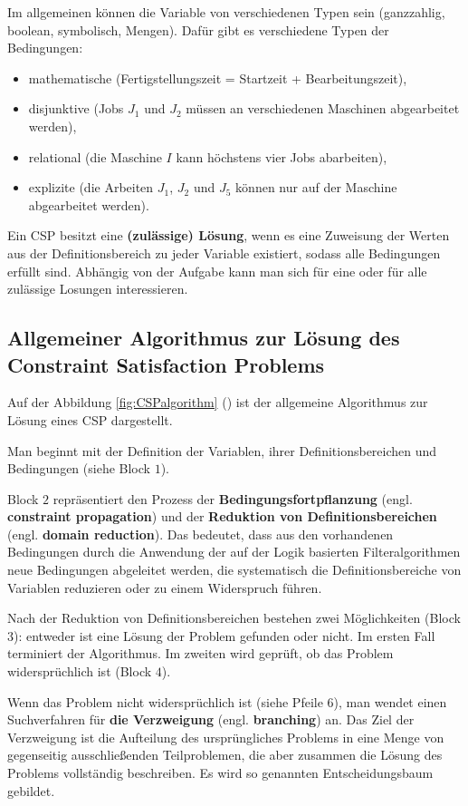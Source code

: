 Im allgemeinen können die Variable von verschiedenen Typen sein (ganzzahlig, boolean, symbolisch, Mengen). Dafür gibt es verschiedene Typen der Bedingungen:
\begin{itemize}
	\setlength{\itemsep}{0pt}
	\item mathematische (Fertigstellungszeit = Startzeit + Bearbeitungszeit),
	\item disjunktive (Jobs $J_1$ und $J_2$ müssen an verschiedenen Maschinen abgearbeitet werden),
	\item relational (die Maschine $I$ kann höchstens vier Jobs abarbeiten),
	\item explizite (die Arbeiten $J_1$, $J_2$ und $J_5$ können nur auf der Maschine abgearbeitet werden).
\end{itemize}
Ein CSP besitzt eine {\bf (zulässige) Lösung}, wenn es eine Zuweisung der Werten aus der  Definitionsbereich zu jeder Variable existiert, sodass alle Bedingungen erfüllt sind. Abhängig von der Aufgabe kann man sich für eine oder für alle zulässige Losungen interessieren.

\subsection{Allgemeiner Algorithmus zur Lösung des Constraint Satisfaction Problems}

Auf der Abbildung \ref{fig:CSPalgorithm} (\cite{CPforScheduling}) ist der allgemeine Algorithmus zur Lösung eines CSP dargestellt. 

Man beginnt mit der Definition der Variablen, ihrer Definitionsbereichen und Bedingungen %
(siehe Block $1$).

Block $2$ repräsentiert den Prozess der {\bf Bedingungsfortpflanzung} (engl. {\bf constraint propagation}) und der {\bf Reduktion von Definitionsbereichen} (engl. {\bf domain reduction}).  Das bedeutet, dass aus den vorhandenen Bedingungen durch die Anwendung der auf der Logik basierten Filteralgorithmen neue Bedingungen abgeleitet werden, die systematisch die Definitionsbereiche von Variablen reduzieren oder zu einem Widerspruch führen.

Nach der Reduktion von Definitionsbereichen bestehen zwei Möglichkeiten (Block $3$): entweder ist eine Lösung der Problem gefunden oder nicht. Im ersten Fall terminiert der Algorithmus. Im zweiten wird geprüft, ob das Problem widersprüchlich ist (Block $4$).

Wenn das Problem nicht widersprüchlich ist (siehe Pfeile $6$), man wendet einen Suchverfahren für {\bf die Verzweigung} (engl. {\bf branching}) an. Das Ziel der Verzweigung ist die Aufteilung des ursprüngliches Problems in eine Menge von gegenseitig ausschließenden Teilproblemen, die aber zusammen die Lösung des Problems vollständig beschreiben. Es wird so genannten Entscheidungsbaum gebildet.

